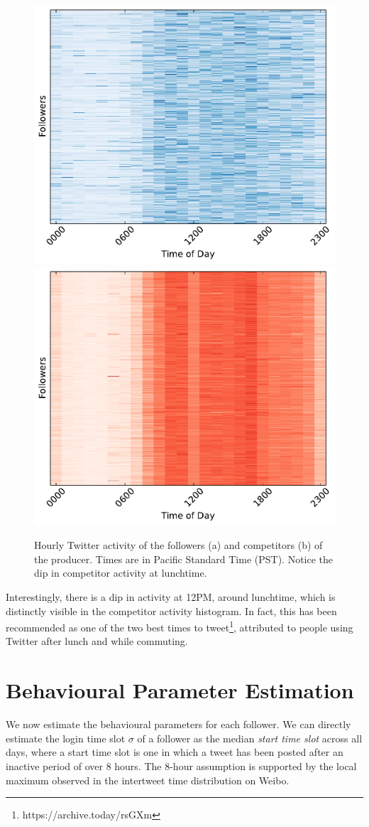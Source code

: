 \documentclass[onecolumn, 12 pt, doublespace, fullpage, letterpaper]{report}
\begin{document}
\begin{figure}
        \includegraphics[width=0.5\linewidth]{follower_heatmap}
        \includegraphics[width=0.5\linewidth]{competitor_heatmap}
    \caption[Hourly Twitter activity of followers and competitors.]{Hourly Twitter activity of the followers (a) and competitors (b) of the producer. Times are in Pacific Standard Time (PST). Notice the dip in competitor activity at lunchtime.}
    \label{fig:follower-competitor}
\end{figure}

Interestingly, there is a dip in activity at 12PM, around lunchtime, which is distinctly visible in the competitor activity histogram. In fact, this has been recommended as one of the two best times to tweet\footnote{https://archive.today/rsGXm}, attributed to people using Twitter after lunch and while commuting.

\section{Behavioural Parameter Estimation}

We now estimate the behavioural parameters for each follower. We can directly estimate the login time slot $\sigma$ of a follower as the median \textit{start time slot} across all days, where a start time slot is one in which a tweet has been posted after an inactive period of over 8 hours. The 8-hour assumption is supported by the local maximum observed in the intertweet time distribution on Weibo.
\end{document}
